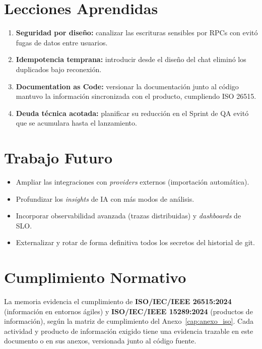 \section{Lecciones Aprendidas}
\label{sec:concl_lecciones}
\begin{enumerate}[noitemsep]
    \item \textbf{Seguridad por diseño:} canalizar las escrituras sensibles por RPCs
     con  evitó fugas de datos entre usuarios.
    \item \textbf{Idempotencia temprana:} introducir  desde el
    diseño del chat eliminó los duplicados bajo reconexión.
    \item \textbf{Documentation as Code:} versionar la documentación junto al código mantuvo la
    información sincronizada con el producto, cumpliendo ISO 26515.
    \item \textbf{Deuda técnica acotada:} planificar su reducción en el Sprint de QA evitó que se
    acumulara hasta el lanzamiento.
\end{enumerate}

\section{Trabajo Futuro}
\label{sec:concl_futuro}
\begin{itemize}[noitemsep]
    \item Ampliar las integraciones con \textit{providers} externos (importación automática).
    \item Profundizar los \textit{insights} de IA con más modos de análisis.
    \item Incorporar observabilidad avanzada (trazas distribuidas) y \textit{dashboards} de SLO.
    \item Externalizar y rotar de forma definitiva todos los secretos del historial de git.
\end{itemize}

\section{Cumplimiento Normativo}
\label{sec:concl_iso}
La memoria evidencia el cumplimiento de \textbf{ISO/IEC/IEEE 26515:2024} (información en entornos
ágiles) y \textbf{ISO/IEC/IEEE 15289:2024} (productos de información), según la matriz de
cumplimiento del Anexo~\ref{cap:anexo_iso}. Cada actividad y producto de información exigido tiene
una evidencia trazable en este documento o en sus anexos, versionada junto al código fuente.


